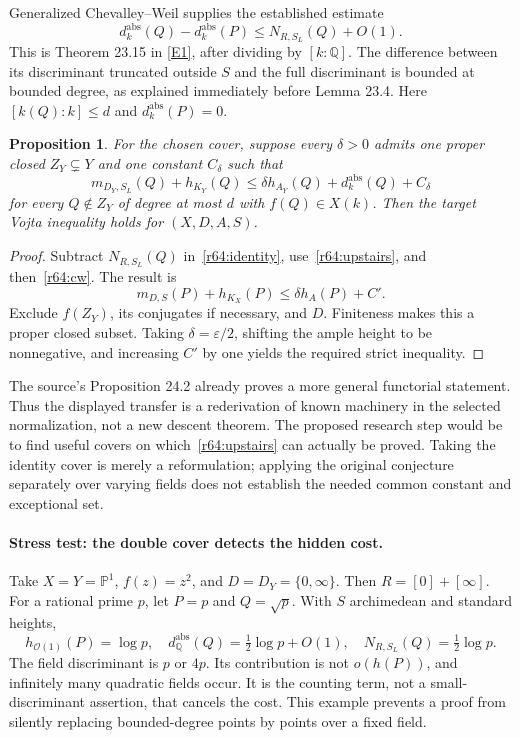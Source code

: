 \documentclass[11pt,a4paper]{article}
\newcommand{\Q}{\mathbb{Q}}
\newcommand{\PP}{\mathbb P}
\newcommand{\eps}{\varepsilon}
\newcommand{\eref}[2]{\hyperlink{extra:#1:#2}{[E#2]}}
\newtheorem{notebookproposition}[notebooklemma]{Proposition}
\numberwithin{equation}{section}
\begin{document}
Generalized Chevalley--Weil supplies the established estimate
\begin{equation}\label{r64:cw}
 d_k^{\mathrm{abs}}(Q)-d_k^{\mathrm{abs}}(P)
       \le N_{R,S_L}(Q)+O(1).
\end{equation}
This is Theorem 23.15 in \eref{statement}{1}, after dividing by $[k:\Q]$. The difference between its discriminant truncated outside $S$ and the full discriminant is bounded at bounded degree, as explained immediately before Lemma 23.4. Here $[k(Q):k]\le d$ and $d_k^{\mathrm{abs}}(P)=0$.

\begin{notebookproposition}\label{r64:descent}
For the chosen cover, suppose every $\delta>0$ admits one proper closed $Z_Y\subsetneq Y$ and one constant $C_\delta$ such that
\begin{equation}\label{r64:upstairs}
 m_{D_Y,S_L}(Q)+h_{K_Y}(Q)
 \le\delta h_{A_Y}(Q)+d_k^{\mathrm{abs}}(Q)+C_\delta
\end{equation}
for every $Q\notin Z_Y$ of degree at most $d$ with $f(Q)\in X(k)$. Then the target Vojta inequality holds for $(X,D,A,S)$.
\end{notebookproposition}
\begin{proof}
Subtract $N_{R,S_L}(Q)$ in~\eqref{r64:identity}, use~\eqref{r64:upstairs}, and then~\eqref{r64:cw}. The result is
\[
 m_{D,S}(P)+h_{K_X}(P)\le\delta h_A(P)+C'.
\]
Exclude $f(Z_Y)$, its conjugates if necessary, and $D$. Finiteness makes this a proper closed subset. Taking $\delta=\eps/2$, shifting the ample height to be nonnegative, and increasing $C'$ by one yields the required strict inequality.
\end{proof}

The source's Proposition 24.2 already proves a more general functorial statement. Thus the displayed transfer is a rederivation of known machinery in the selected normalization, not a new descent theorem. The proposed research step would be to find useful covers on which~\eqref{r64:upstairs} can actually be proved. Taking the identity cover is merely a reformulation; applying the original conjecture separately over varying fields does not establish the needed common constant and exceptional set.

\paragraph{Stress test: the double cover detects the hidden cost.}
Take $X=Y=\PP^1$, $f(z)=z^2$, and $D=D_Y=\{0,\infty\}$. Then $R=[0]+[\infty]$. For a rational prime $p$, let $P=p$ and $Q=\sqrt p$. With $S$ archimedean and standard heights,
\[
 h_{\mathcal O(1)}(P)=\log p,\quad
 d_{\Q}^{\mathrm{abs}}(Q)=\tfrac12\log p+O(1),\quad
 N_{R,S_L}(Q)=\tfrac12\log p.
\]
The field discriminant is $p$ or $4p$. Its contribution is not $o(h(P))$, and infinitely many quadratic fields occur. It is the counting term, not a small-discriminant assertion, that cancels the cost. This example prevents a proof from silently replacing bounded-degree points by points over a fixed field.
\end{document}
